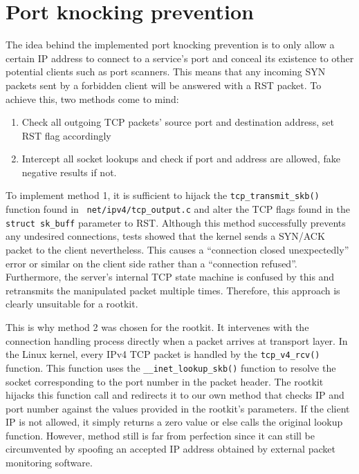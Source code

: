 \section{Port knocking prevention}
The idea behind the implemented port knocking prevention is to only allow a 
certain IP address to connect to a service's port and conceal its existence to 
other potential clients such as port scanners. 
This means that any incoming SYN packets sent by a forbidden client will be 
answered with a RST packet. To achieve this,
two methods come to mind:
\begin{enumerate}
 \item Check all outgoing TCP packets' source port and destination address, set 
RST flag accordingly
 \item Intercept all socket lookups and check if port and address are allowed, 
fake negative results if not.
\end{enumerate}
To implement method 1, it is sufficient to hijack the 
\verb+tcp_transmit_skb()+ function found in ~\texttt{net/ipv4/tcp\_output.c} 
and alter the TCP flags found in the \verb+struct sk_buff+
parameter to RST. Although this method successfully prevents any undesired 
connections, tests showed that the kernel sends a SYN/ACK
packet to the client nevertheless. This causes a ``connection closed 
unexpectedly'' error or similar on the client side rather than a
``connection refused''. Furthermore, the server's internal TCP state machine is 
confused by this and retransmits the manipulated packet
multiple times. Therefore, this approach is clearly unsuitable for a rootkit. 
\par
This is why method 2 was chosen for the rootkit. It intervenes with the 
connection handling process directly when a packet arrives at transport layer.
In the Linux kernel, every IPv4 TCP packet is handled by the 
\texttt{tcp\_v4\_rcv()} function. This 
function uses the \texttt{\_\_inet\_lookup\_skb()} function to resolve the 
socket 
corresponding to the port number in the packet header. The rootkit hijacks this 
function call and
redirects it to our own method that checks IP and port number against the values 
provided in the rootkit's parameters. If the client IP
is not allowed, it simply returns a zero value or else calls the original 
lookup 
function.
However, method still is far from perfection since it can still be circumvented 
by spoofing an accepted IP address obtained by external packet monitoring 
software.
